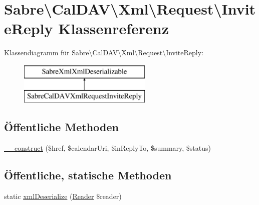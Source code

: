 \hypertarget{class_sabre_1_1_cal_d_a_v_1_1_xml_1_1_request_1_1_invite_reply}{}\section{Sabre\textbackslash{}Cal\+D\+AV\textbackslash{}Xml\textbackslash{}Request\textbackslash{}Invite\+Reply Klassenreferenz}
\label{class_sabre_1_1_cal_d_a_v_1_1_xml_1_1_request_1_1_invite_reply}
Klassendiagramm für Sabre\textbackslash{}Cal\+D\+AV\textbackslash{}Xml\textbackslash{}Request\textbackslash{}Invite\+Reply\+:\begin{figure}[H]
\begin{center}
\leavevmode
\includegraphics[height=2.000000cm]{class_sabre_1_1_cal_d_a_v_1_1_xml_1_1_request_1_1_invite_reply}
\end{center}
\end{figure}
\subsection*{Öffentliche Methoden}
\begin{DoxyCompactItemize}
\item 
\mbox{\hyperlink{class_sabre_1_1_cal_d_a_v_1_1_xml_1_1_request_1_1_invite_reply_a2e579e3e8ac2e18cee832ffdfa0ab45c}{\+\_\+\+\_\+construct}} (\$href, \$calendar\+Uri, \$in\+Reply\+To, \$summary, \$status)
\end{DoxyCompactItemize}
\subsection*{Öffentliche, statische Methoden}
\begin{DoxyCompactItemize}
\item 
static \mbox{\hyperlink{class_sabre_1_1_cal_d_a_v_1_1_xml_1_1_request_1_1_invite_reply_a4fe88d63d99b91d0a8aecd30c7f86e8d}{xml\+Deserialize}} (\mbox{\hyperlink{class_sabre_1_1_xml_1_1_reader}{Reader}} \$reader)
\end{DoxyCompactItemize}
